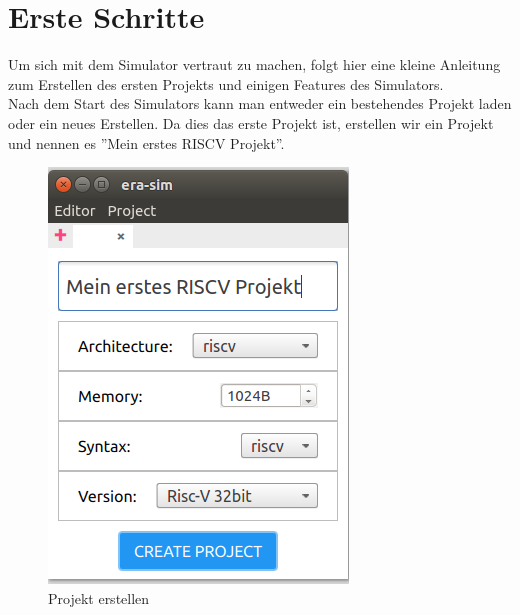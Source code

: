 
\section{Erste Schritte}


Um sich mit dem Simulator vertraut zu machen, folgt hier eine kleine Anleitung
zum Erstellen des ersten Projekts und einigen Features des Simulators.\\

Nach dem Start des Simulators kann man entweder ein bestehendes Projekt laden
oder ein neues Erstellen. Da dies das erste Projekt ist, erstellen wir ein
Projekt und nennen es ''Mein erstes RISCV Projekt''.\\

\begin{figure}[H]
	\centering
	\includegraphics[scale=1.0]{Images/first-steps-1.png}
	\caption{Projekt erstellen}
\end{figure}

